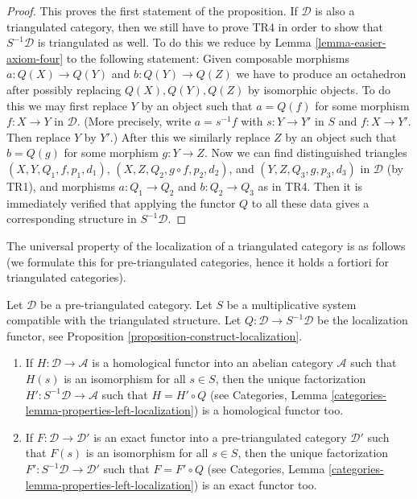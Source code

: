 \begin{proof}
\medskip\noindent
This proves the first statement of the proposition. If $\mathcal{D}$ is also
a triangulated category, then we still have to prove TR4 in order to show
that $S^{-1}\mathcal{D}$ is triangulated as well. To do this we reduce by
Lemma \ref{lemma-easier-axiom-four}
to the following statement: Given composable morphisms
$a : Q(X) \to Q(Y)$ and $b : Q(Y) \to Q(Z)$ we have to produce
an octahedron after possibly replacing $Q(X), Q(Y), Q(Z)$ by isomorphic
objects. To do this we may first replace $Y$ by an object such that
$a = Q(f)$ for some morphism $f : X \to Y$ in $\mathcal{D}$. (More precisely,
write $a = s^{-1}f$ with $s : Y \to Y'$ in $S$ and $f : X \to Y'$. Then
replace $Y$ by $Y'$.) After this we similarly replace $Z$ by an object such
that $b = Q(g)$ for some morphism $g : Y \to Z$. Now we can find
distinguished triangles $(X, Y, Q_1, f, p_1, d_1)$,
$(X, Z, Q_2, g \circ f, p_2, d_2)$, and
$(Y, Z, Q_3, g, p_3, d_3)$ in $\mathcal{D}$ (by TR1), and
morphisms $a : Q_1 \to Q_2$ and $b : Q_2 \to Q_3$ as in TR4.
Then it is immediately verified that applying the functor $Q$ to
all these data gives a corresponding structure in $S^{-1}\mathcal{D}$.
\end{proof}

\noindent
The universal property of the localization of a triangulated category
is as follows (we formulate this for pre-triangulated categories, hence
it holds a fortiori for triangulated categories).

\begin{lemma}
\label{lemma-universal-property-localization}
Let $\mathcal{D}$ be a pre-triangulated category. Let $S$ be a multiplicative
system compatible with the triangulated structure. Let
$Q : \mathcal{D} \to S^{-1}\mathcal{D}$ be the localization functor, see
Proposition \ref{proposition-construct-localization}.
\begin{enumerate}
\item If $H : \mathcal{D} \to \mathcal{A}$ is a homological functor into
an abelian category $\mathcal{A}$ such that $H(s)$ is an isomorphism for
all $s \in S$, then the unique factorization
$H' : S^{-1}\mathcal{D} \to \mathcal{A}$ such that $H = H' \circ Q$ (see
Categories, Lemma \ref{categories-lemma-properties-left-localization})
is a homological functor too.
\item If $F : \mathcal{D} \to \mathcal{D}'$ is an exact functor into
a pre-triangulated category $\mathcal{D}'$ such that $F(s)$ is an isomorphism
for all $s \in S$, then the unique factorization
$F' : S^{-1}\mathcal{D} \to \mathcal{D}'$ such that $F = F' \circ Q$ (see
Categories, Lemma \ref{categories-lemma-properties-left-localization})
is an exact functor too.
\end{enumerate}
\end{lemma}

